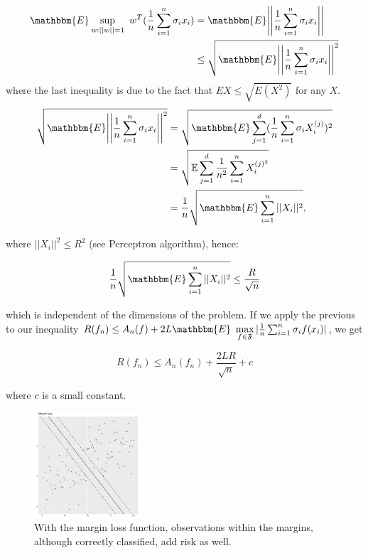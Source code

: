 \documentclass[11pt, english]{article}
\begin{document}
\begin{align} 
	 \mathbbm{E} \sup\limits_{w:||w||=1} \ w^T(\frac{1}{n} \sum_{i=1}^{n} \sigma_i x_i) &=\mathbbm{E} \Bigg|\Bigg|\frac{1}{n} \sum_{i=1}^{n} \sigma_i x_i\Bigg|\Bigg|\\
 	 &\leq \sqrt{\mathbbm{E}\Bigg|\Bigg|\frac{1}{n} \sum_{i=1}^{n} \sigma_i x_i\Bigg|\Bigg|^2}
\end{align}
where the last inequality is due to the fact that $EX \leq \sqrt{E(X^2)}$ for any $X$.
\begin{align}
 	 \sqrt{\mathbbm{E}\Bigg|\Bigg|\frac{1}{n} \sum_{i=1}^{n} \sigma_i x_i\Bigg|\Bigg|^2}&= \sqrt{\mathbbm{E} \sum_{j=1}^{d} (\frac{1}{n} \sum_{i=1}^{n} \sigma_i X_i^{(j)})^2}\\
 	 &=\sqrt{\mathbb{E}\sum_{j=1}^{d}\frac{1}{n^2}\sum_{i=1}^{n}X_i^{(j)^2}}\\
	 &= \frac{1}{n} \sqrt{\mathbbm{E} \sum_{i=1}^{n} ||X_i||^2},
\end{align}
 
where $||X_i||^2 \leq R^2$ (see Perceptron algorithm), hence: 

\begin{equation}
\frac{1}{n} \sqrt{\mathbbm{E} \sum_{i=1}^{n} ||X_i||^2} \leq \frac{R}{\sqrt{n}}
\end{equation}

 
which is independent of the dimensions of the problem. If we apply the previous to our inequality $R(f_n) \leq A_n(f) + 2L \mathbbm{E}\ \max\limits_{f \in \mathfrak{F}} |\frac{1}{n} \sum_{i=1}^{n}\sigma_i f(x_i)|$, we get 
 
\begin{equation}
R(f_n) \leq A_n(f_n) + \frac{2LR}{\sqrt{n}} + c
\end{equation} 


 
where $c$ is a small constant.\\
 
 
\begin{figure}
 	\centering
 	\includegraphics[width=0.35\textwidth]{marginloss.pdf}
 	\caption{\small With the margin loss function, observations within the margins, although correctly classified, add risk as well.}
\end{figure}
 
\end{document}
